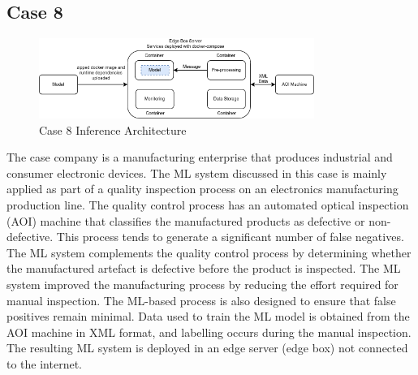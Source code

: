 \subsection*{Case 8} %
\label{case: 8}


\begin{figure}[h!]
\centering
\includegraphics[width=0.8\textwidth]{images/case8_deployment_process_v2.png}
\caption{Case 8 Inference Architecture}
\label{fig: case8_deployment_process}
\end{figure}

The case company is a manufacturing enterprise that produces industrial and consumer electronic devices. The ML system discussed in this case is mainly applied as part of a quality inspection process on an electronics manufacturing production line. The quality control process has an automated optical inspection (AOI) machine that classifies the manufactured products as defective or non-defective. This process tends to generate a significant number of false negatives. The ML system complements the quality control process by determining whether the manufactured artefact is defective before the product is inspected. The ML system improved the manufacturing process by reducing the effort required for manual inspection. The ML-based process is also designed to ensure that false positives remain minimal. Data used to train the ML model is obtained from the AOI machine in XML format, and labelling occurs during the manual inspection. The resulting ML system is deployed in an edge server (edge box) not connected to the internet.
 

